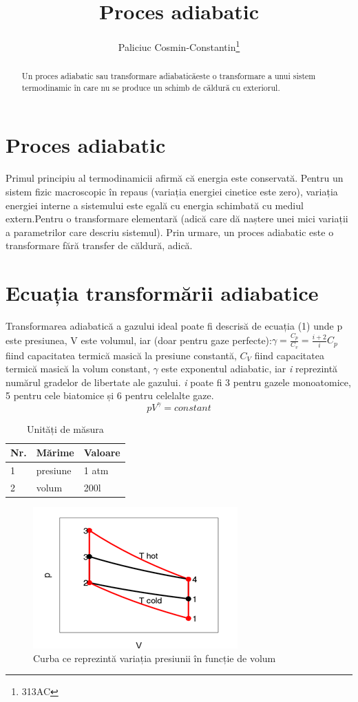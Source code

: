 \documentclass{article}
\title{Proces adiabatic}
\author{Paliciuc Cosmin-Constantin\footnote{313AC}}
\date{}
\begin{document}
\maketitle
\begin{abstract}
Un proces adiabatic sau transformare adiabaticăeste o transformare a unui sistem termodinamic în care nu se produce un schimb de căldură cu exteriorul.
\end{abstract}
%
\section{Proces adiabatic}\label{intro}
Primul principiu al termodinamicii afirmă că energia este conservată. Pentru un sistem fizic macroscopic în repaus\cite{Bazil Popa} (variația energiei cinetice este zero), variația energiei interne a sistemului este egală cu energia schimbată cu mediul extern.Pentru o transformare elementară (adică care dă naștere unei mici variații a parametrilor care descriu sistemul). Prin urmare, un proces adiabatic este o transformare fără transfer de căldură, adică.
\section{Ecuația transformării adiabatice}
Transformarea adiabatică a gazului ideal poate fi descrisă de ecuația (1) unde p este presiunea, V este volumul, iar (doar pentru gaze perfecte):\( \gamma  =\frac{C_{p}}{C_{v}} =\frac{i+2}{i}\)\( C_{p}\) fiind capacitatea termică masică la presiune constantă, \( C_{V}\)  fiind capacitatea termică masică la volum constant, \( \gamma\) este exponentul adiabatic, iar \textit{i} reprezintă numărul gradelor de libertate ale gazului. \textit{i} poate fi 3 pentru gazele monoatomice, 5 pentru cele biatomice și 6 pentru celelalte gaze.\cite{Ioan Vlădea}
	\begin{equation}
	pV^{\gamma } = constant
	\end{equation}
	\begin{table}[htbp]
	\centering
	\caption{Unități de măsura}\label{tab:unit}
	\begin{tabular}{lll}
	\hline
	Nr.&Mărime&Valoare\\\hline
	1 &presiune&1 atm\\\hline
	2&volum&200l\\\hline
\end{tabular}
\end{table}
\newpage
\begin{figure}[ht]
\centering
\includegraphics[scale=0.8]{Picture1.png}
\caption{Curba ce reprezintă variația presiunii în funcție de volum}\label{fig:figura}
\end{figure}
\end{document}
